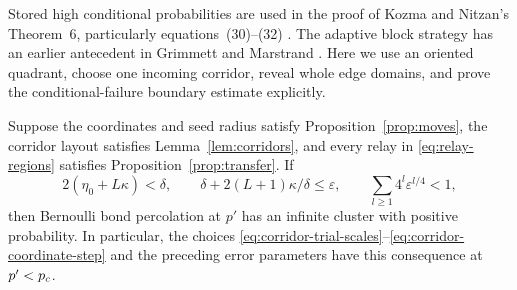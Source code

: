 Stored high conditional probabilities are used in the proof of
Kozma and Nitzan's Theorem~6, particularly equations~(30)--(32)
\cite{KozmaNitzan2024}. The adaptive block strategy has an earlier
antecedent in Grimmett and Marstrand \cite[Sections~3--4]{GrimmettMarstrand1990}.
Here we use an oriented quadrant, choose one incoming corridor,
reveal whole edge domains, and prove the conditional-failure boundary
estimate explicitly.

\begin{proposition}\label{prop:exploration}
Suppose the coordinates and seed radius satisfy
Proposition~\ref{prop:moves}, the corridor layout satisfies
Lemma~\ref{lem:corridors}, and every relay in
\eqref{eq:relay-regions} satisfies Proposition~\ref{prop:transfer}.
If
\[
 2(\eta_0+L\kappa)<\delta,\qquad
 \delta+2(L+1)\kappa/\delta\le\varepsilon,
 \qquad\sum_{l\ge1}4^l\varepsilon^{l/4}<1,
\]
then Bernoulli bond percolation at $p'$ has an infinite cluster with
positive probability. In particular, the choices
\eqref{eq:corridor-trial-scales}--\eqref{eq:corridor-coordinate-step}
and the preceding error parameters have this consequence at $p'<p_c$.
\end{proposition}

